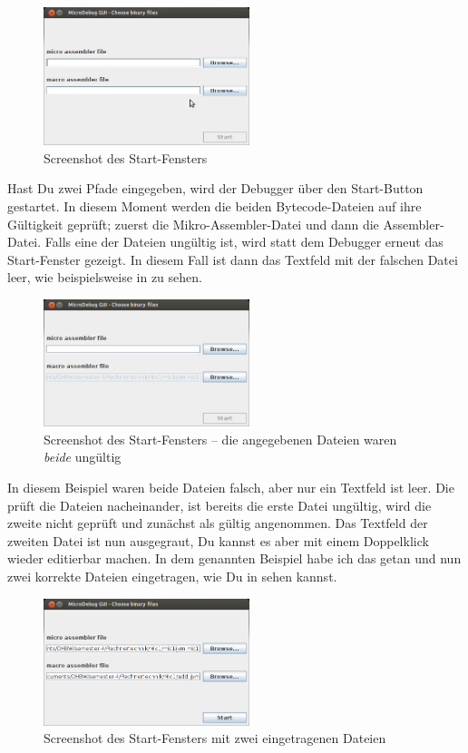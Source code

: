 \begin{figure}[h]
	\centering
	\includegraphics[width=6cm]{images/start-frame-empty}
	\caption{Screenshot des Start-Fensters}
\end{figure}

Hast Du zwei Pfade eingegeben, wird der Debugger über den Start-Button gestartet. In diesem Moment werden die beiden Bytecode-Dateien auf ihre Gültigkeit geprüft; zuerst die Mikro-Assembler-Datei und dann die Assembler-Datei. Falls eine der Dateien ungültig ist, wird statt dem Debugger erneut das Start-Fenster gezeigt. In diesem Fall ist dann das Textfeld mit der falschen Datei leer, wie beispielsweise in  zu sehen.

\begin{figure}[h]
	\centering
	\includegraphics[width=6cm]{images/start-frame-both-wrong}
	\caption{Screenshot des Start-Fensters -- die angegebenen Dateien waren \emph{beide} ungültig}
\end{figure}

In diesem Beispiel waren beide Dateien falsch, aber nur ein Textfeld ist leer. Die \mdg prüft die Dateien nacheinander, ist bereits die erste Datei ungültig, wird die zweite nicht geprüft und zunächst als gültig angenommen. Das Textfeld der zweiten Datei ist nun ausgegraut, Du kannst es aber mit einem Doppelklick wieder editierbar machen. In dem genannten Beispiel habe ich das getan und nun zwei korrekte Dateien eingetragen, wie Du in  sehen kannst.

\begin{figure}[h]
	\centering
	\includegraphics[width=6cm]{images/start-frame-both-filled}
	\caption{Screenshot des Start-Fensters mit zwei eingetragenen Dateien}
\end{figure}

